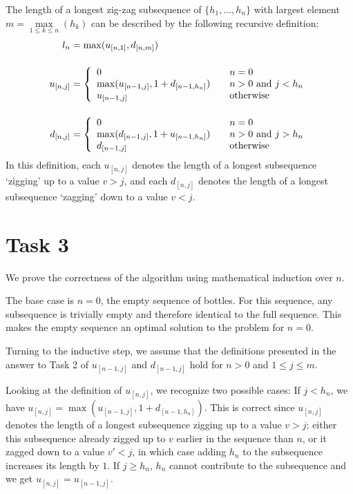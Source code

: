 \documentclass[paper=a4, fleqn]{article}
\begin{document}
The length of a longest zig-zag subsequence of $\{h_1,\ldots,h_n\}$ with largest
element $m=\max\limits_{1\leq k\leq n}(h_k)$ can be described by the following
recursive definition:
\begin{align*}
  l_n &= \max(u_{[n,1]}, d_{[n,m]})\\[12pt]
u_{[n, j]} &= \left\{
  \begin{array}{l l}
    0& \quad \text{$n=0$}\\
    \max(u_{[n-1,j]}, 1+d_{[n-1,h_n]})& \quad\text{$n>0$ and $j<h_n$}\\
    u_{[n-1,j]}& \quad\text{otherwise}
  \end{array} \right.\\[12pt]
d_{[n, j]} &= \left\{
  \begin{array}{l l}
    0& \quad \text{$n=0$}\\
    \max(d_{[n-1,j]}, 1+u_{[n-1,h_n]})& \quad\text{$n>0$ and $j>h_n$}\\
    d_{[n-1,j]}& \quad\text{otherwise}
  \end{array} \right.
\end{align*}
In this definition, each $u_{[n,j]}$ denotes the length of a longest subsequence
`zigging' up to a value $v>j$, and each $d_{[n,j]}$ denotes the
length of a longest subsequence `zagging' down to a value $v<j$.

\section*{Task 3}

We prove the correctness of the algorithm using mathematical induction over $n$.

The base case is $n=0$, the empty sequence of bottles. For this sequence, any
subsequence is trivially empty and therefore identical to the full
sequence. This makes the empty sequence an optimal solution to the problem for
$n=0$.

Turning to the inductive step, we assume that the definitions presented in the
answer to Task 2 of $u_{[n-1, j]}$ and $d_{[n-1, j]}$ hold for $n>0$ and $1\leq
j\leq m$.

Looking at the definition of $u_{[n, j]}$, we recognize two possible cases: If
$j<h_n$, we have $u_{[n, j]}=\max(u_{[n-1,j]}, 1+d_{[n-1,h_n]})$. This is
correct since $u_{[n, j]}$ denotes the length of a longest subsequence zigging
up to a value $v>j$; either this subsequence already zigged up to $v$ earlier in
the sequence than $n$, or it zagged down to a value $v'<j$, in which case adding
$h_n$ to the subsequence increases its length by $1$. If $j\geq h_n$, $h_n$
cannot contribute to the subsequence and we get $u_{[n, j]}=u_{[n-1, j]}$.
\end{document}
